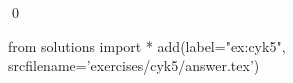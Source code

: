 
\begin{ex} 
  \label{ex:cyk5}
  
  \qed
\end{ex} 
\begin{python0}
from solutions import *
add(label="ex:cyk5",
    srcfilename='exercises/cyk5/answer.tex') 
\end{python0}

